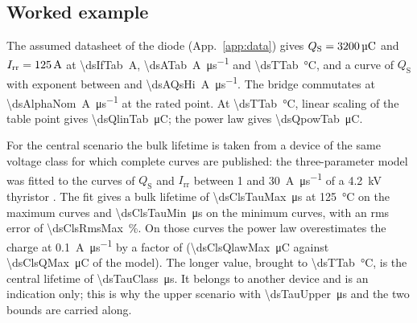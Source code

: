 \documentclass[10pt,a4paper]{scrartcl}
\newcommand{\Irr}{I_\mathrm{rr}}
\begin{document}
\subsection{Worked example}
\label{sec:ex-recovery}
The assumed datasheet of the diode (App.~\ref{app:data}) gives $Q_\mathrm{S} = \SI{3200}{\micro\coulomb}$ and $\Irr = \SI{\dsIrrTab}{\ampere}$ at \SI{\dsIfTab}{\ampere}, \SI{\dsATab}{\ampere\per\micro\second} and \SI{\dsTTab}{\celsius}, and a curve of $Q_\mathrm{S}$ with exponent \dsQsSlope{} between \dsAQsLo{} and \SI{\dsAQsHi}{\ampere\per\micro\second}. The bridge commutates at \SI{\dsAlphaNom}{\ampere\per\micro\second} at the rated point. At \SI{\dsTTab}{\celsius}, linear scaling of the table point gives \SI{\dsQlinTab}{\micro\coulomb}; the power law gives \SI{\dsQpowTab}{\micro\coulomb}.

For the central scenario the bulk lifetime is taken from a device of the same voltage class for which complete curves are published: the three-parameter model was fitted to the curves of $Q_\mathrm{S}$ and $\Irr$ between 1 and \SI{30}{\ampere\per\micro\second} of a \SI{4.2}{\kilo\volt} thyristor \cite[Figs.~12 and~13]{an5950}. The fit gives a bulk lifetime of \SI{\dsClsTauMax}{\micro\second} at \SI{125}{\celsius} on the maximum curves and \SI{\dsClsTauMin}{\micro\second} on the minimum curves, with an rms error of \SI{\dsClsRmsMax}{\percent}. On those curves the power law overestimates the charge at \SI{0.1}{\ampere\per\micro\second} by a factor of \dsClsQratioMax{} (\SI{\dsClsQlawMax}{\micro\coulomb} against \SI{\dsClsQMax}{\micro\coulomb} of the model). The longer value, brought to \SI{\dsTTab}{\celsius}, is the central lifetime of \SI{\dsTauClass}{\micro\second}. It belongs to another device and is an indication only; this is why the upper scenario with \SI{\dsTauUpper}{\micro\second} and the two bounds are carried along.
\end{document}
